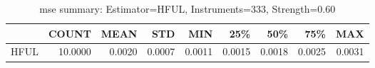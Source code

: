 \begin{table}[ht]
\centering
\caption{mse summary: Estimator=HFUL, Instruments=333, Strength=0.60}
\begin{tabular}{lrrrrrrrr}
\toprule
 & COUNT & MEAN & STD & MIN & 25\% & 50\% & 75\% & MAX \\
\midrule
HFUL & 10.0000 & 0.0020 & 0.0007 & 0.0011 & 0.0015 & 0.0018 & 0.0025 & 0.0031 \\
\bottomrule
\end{tabular}
\end{table}
